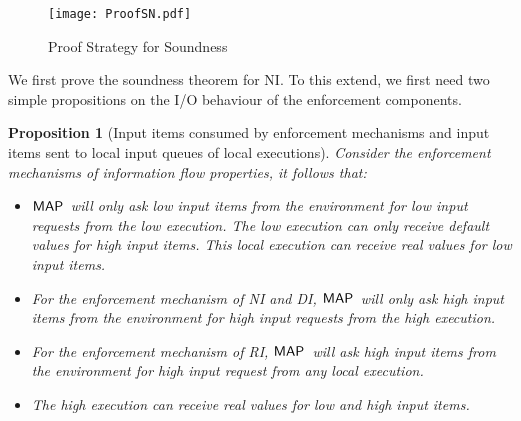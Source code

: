 \documentclass[10pt,a4paper,oneside]{article}
\newtheorem{proposition}{Proposition}[section]
\def\sanserif#1{\ensuremath{\sf #1}}
\def\MAP{\ensuremath{\sanserif{MAP}}}
\begin{document}
\begin{figure}
\centering
\texttt{[image: ProofSN.pdf]}
\caption{Proof Strategy for Soundness}
\label{fig:proof:SN}
\end{figure}

We first prove the soundness theorem for NI. To this extend, we first need two simple propositions on the I/O behaviour of the enforcement components.

\begin{proposition}[Input items consumed by enforcement mechanisms and input items sent to local input queues of local executions]\label{prop:InputOfEMP} Consider the enforcement mechanisms of information flow properties, it follows that:
\begin{itemize}
\item \MAP\ will only ask low input items from the environment for low input requests from the low execution. The low execution can only receive default values for high input items. This local execution can receive real values for low input items.

\item For the enforcement mechanism of NI and DI, \MAP\ will only ask high input items from the environment for high input requests from the high execution.

\item For the enforcement mechanism of RI, \MAP\ will ask high input items from the environment for high input request from any local execution.

\item The high execution can receive real values for low and high input items.
\end{itemize}
\end{proposition}
\end{document}

